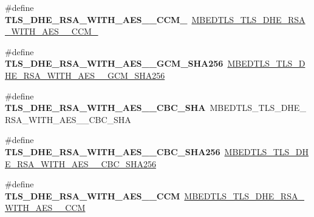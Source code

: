 \begin{DoxyCompactItemize}
\item 
\mbox{\label{compat-1_83_8h_ac18f8b5ce841e70e80c0f57250c44863}} 
\#define {\bfseries T\+L\+S\+\_\+\+D\+H\+E\+\_\+\+R\+S\+A\+\_\+\+W\+I\+T\+H\+\_\+\+A\+E\+S\+\_\+\_\+\+C\+C\+M\+\_}~\mbox{\hyperlink{ssl__ciphersuites_8h_a0ad8cceec914f058c041251bdbf17bf1}{M\+B\+E\+D\+T\+L\+S\+\_\+\+T\+L\+S\+\_\+\+D\+H\+E\+\_\+\+R\+S\+A\+\_\+\+W\+I\+T\+H\+\_\+\+A\+E\+S\+\_\+\_\+\+C\+C\+M\+\_}}
\item 
\mbox{\label{compat-1_83_8h_a3dc8b4ef99deb86586540f85e9c65d01}} 
\#define {\bfseries T\+L\+S\+\_\+\+D\+H\+E\+\_\+\+R\+S\+A\+\_\+\+W\+I\+T\+H\+\_\+\+A\+E\+S\+\_\+\_\+\+G\+C\+M\+\_\+\+S\+H\+A256}~\mbox{\hyperlink{ssl__ciphersuites_8h_aaeb52cd4251f8ea0b75808697cece263}{M\+B\+E\+D\+T\+L\+S\+\_\+\+T\+L\+S\+\_\+\+D\+H\+E\+\_\+\+R\+S\+A\+\_\+\+W\+I\+T\+H\+\_\+\+A\+E\+S\+\_\+\_\+\+G\+C\+M\+\_\+\+S\+H\+A256}}
\item 
\mbox{\label{compat-1_83_8h_a65276549afb8b9be55964d1b16d7299a}} 
\#define {\bfseries T\+L\+S\+\_\+\+D\+H\+E\+\_\+\+R\+S\+A\+\_\+\+W\+I\+T\+H\+\_\+\+A\+E\+S\+\_\+\_\+\+C\+B\+C\+\_\+\+S\+HA}~M\+B\+E\+D\+T\+L\+S\+\_\+\+T\+L\+S\+\_\+\+D\+H\+E\+\_\+\+R\+S\+A\+\_\+\+W\+I\+T\+H\+\_\+\+A\+E\+S\+\_\+\_\+\+C\+B\+C\+\_\+\+S\+HA
\item 
\mbox{\label{compat-1_83_8h_a5c8a49fea187f9bc19c43520f22d960b}} 
\#define {\bfseries T\+L\+S\+\_\+\+D\+H\+E\+\_\+\+R\+S\+A\+\_\+\+W\+I\+T\+H\+\_\+\+A\+E\+S\+\_\+\_\+\+C\+B\+C\+\_\+\+S\+H\+A256}~\mbox{\hyperlink{ssl__ciphersuites_8h_a308b9de538829ef3a318ef38f5d7399d}{M\+B\+E\+D\+T\+L\+S\+\_\+\+T\+L\+S\+\_\+\+D\+H\+E\+\_\+\+R\+S\+A\+\_\+\+W\+I\+T\+H\+\_\+\+A\+E\+S\+\_\+\_\+\+C\+B\+C\+\_\+\+S\+H\+A256}}
\item 
\mbox{\label{compat-1_83_8h_a3d03a1a519d0b0b81d855bd9e34a320a}} 
\#define {\bfseries T\+L\+S\+\_\+\+D\+H\+E\+\_\+\+R\+S\+A\+\_\+\+W\+I\+T\+H\+\_\+\+A\+E\+S\+\_\+\_\+\+C\+CM}~\mbox{\hyperlink{ssl__ciphersuites_8h_a10937f2f9cdb3fb09a492579ba7e3a81}{M\+B\+E\+D\+T\+L\+S\+\_\+\+T\+L\+S\+\_\+\+D\+H\+E\+\_\+\+R\+S\+A\+\_\+\+W\+I\+T\+H\+\_\+\+A\+E\+S\+\_\+\_\+\+C\+CM}}
\item 
\mbox{\label{compat-1_83_8h_a605206196f3cf23bf9f93541e4bfdf34}} 

\end{DoxyCompactItemize}
